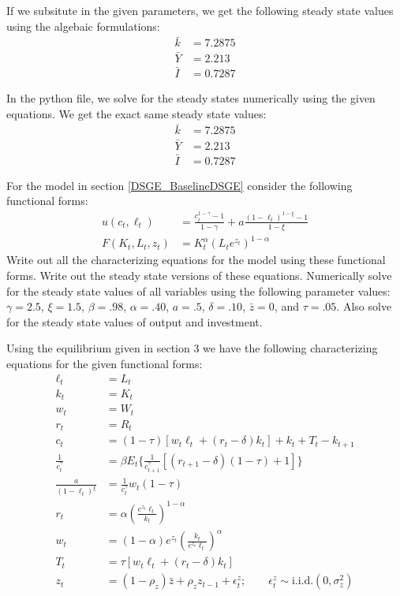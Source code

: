 \documentclass[letterpaper,11pt]{article}
\theoremstyle{definition}
\begin{document}
\begin{spacing}{1.5}
	If we subsitute in the given parameters, we get the following steady state values using the algebaic formulations:
	\begin{align*}
		\bar{k} &= 7.2875 \\
		\bar{Y} &= 2.213\\
		\bar{I} &= 0.7287
	\end{align*}

	In the python file, we solve for the steady states numerically using the given equations. We get the exact same steady state values:
	\begin{align*}
		\bar{k} &= 7.2875 \\
		\bar{Y} &= 2.213\\
		\bar{I} &= 0.7287
	\end{align*}

	\begin{Exercise} \label{DSGE_HW_CES}
		For the model in section \ref{DSGE_BaselineDSGE} consider the following functional forms:
		\begin{equation}\label{DSGE_HW_CES_eq01}
		\begin{split}
		u(c_t,\ell_t) & = \frac{c^{1-\gamma}_t -1}{1-\gamma}+ a \frac{(1-\ell_t)^{1-\xi}-1}{1-\xi}      \\
		F(K_t,L_t,z_t) & = K^{\alpha}_t (L_te^{z_t})^{1-\alpha}  \nonumber
		\end{split}
		\end{equation}
		Write out all the characterizing equations for the model using these functional forms.  {}Write out the steady state versions of these equations.  Numerically solve for the steady state values of all variables using the following parameter values: $\gamma = 2.5$, $\xi = 1.5$,  $\beta = .98$, $\alpha = .40$, $a=.5$, $\delta = .10$, $\bar z = 0$, and $\tau = .05$.  Also solve for the steady state values of output and investment.
	\end{Exercise}

	Using the equilibrium given in section 3 we have the following characterizing equations for the given functional forms:
	\begin{align*}
		\ell_t &= L_t \\
		k_t &= K_t \\
		w_t &= W_t \\
		r_t &= R_t \\
		c_t &= (1-\tau)[w_t\ell_t+(r_t-\delta)k_t]+k_t+T_t-k_{t+1} \\
		\frac{1}{c_t^\gamma} &=  \beta E_t \{\frac{1}{c_{t+1}^\gamma}[(r_{t+1}-\delta)(1-\tau)+1]\} \\
		\frac{a}{(1-\ell_t)^\xi} &= \frac{1}{c_t^\gamma} w_t(1-\tau) \\
		r_t&= \alpha (\frac{e^{z_t}\ell_t}{k_t})^{1-\alpha}\\
		w_t&= (1-\alpha)e^{z_t} (\frac{k_t}{e^{z_t}\ell_t})^{\alpha}\\
		T_t &= \tau[w_t\ell_t+(r_t-\delta)k_t] \\
		z_t &= (1-\rho_z)\bar{z}+\rho_zz_{t-1}+\epsilon_t^z; \qquad \epsilon_t^z \sim \text{i.i.d.}(0,\sigma_z^2)
	\end{align*}


\end{spacing}
\end{document}
